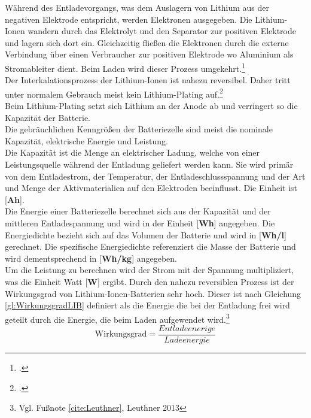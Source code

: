 Während des Entladevorgangs, was dem Auslagern von Lithium aus der negativen Elektrode entspricht, werden Elektronen ausgegeben. Die Lithium-Ionen wandern durch das Elektrolyt und den Separator zur positiven Elektrode und lagern sich dort ein. Gleichzeitig fließen die Elektronen durch die externe Verbindung über einen Verbraucher zur positiven Elektrode wo Aluminium als Stromableiter dient. Beim Laden wird dieser Prozess umgekehrt.\footcite[Vgl.\label{cite:Leuthner}][S. 13-19]{Leuthner.2013}\\
Der Interkalationsprozess der Lithium-Ionen ist nahezu reversibel. Daher tritt unter normalem Gebrauch meist kein Lithium-Plating auf.\footcite[Vgl.][S. 265-270]{DAHN1994}\\
Beim Lithium-Plating setzt sich Lithium an der Anode ab und verringert so die Kapazität der Batterie.\\


Die gebräuchlichen Kenngrößen der Batteriezelle sind meist die nominale Kapazität, elektrische Energie und Leistung. \\
Die Kapazität ist die Menge an elektrischer Ladung, welche von einer Leistungsquelle während der Entladung geliefert werden kann. Sie wird primär von dem Entladestrom, der Temperatur, der Entladeschlussspannung und der Art und Menge der Aktivmaterialien auf den Elektroden beeinflusst. Die Einheit ist [\textbf{Ah}].\\
Die Energie einer Batteriezelle berechnet sich aus der Kapazität und der mittleren Entladespannung und wird in der Einheit [\textbf{Wh}] angegeben. Die Energiedichte bezieht sich auf das Volumen der Batterie und wird in [\textbf{Wh/l}] gerechnet. Die spezifische Energiedichte referenziert die Masse der Batterie und wird dementsprechend in [\textbf{Wh/kg}] angegeben.\\
Um die Leistung zu berechnen wird der Strom mit der Spannung multipliziert, was die Einheit Watt [\textbf{W}] ergibt. Durch den nahezu reversiblen Prozess ist der Wirkungsgrad von Lithium-Ionen-Batterien sehr hoch. Dieser ist nach Gleichung \ref{gl:WirkungsgradLIB} definiert als die Energie die bei der Entladung frei wird geteilt durch die Energie, die beim Laden aufgewendet wird.\footnote{Vgl. Fußnote \ref{cite:Leuthner}, Leuthner 2013}\\

\begin{equation}
	\mbox{Wirkungsgrad} = \frac{Entladeenerige}{Ladeenergie}
	\label{gl:WirkungsgradLIB}
\end{equation}


